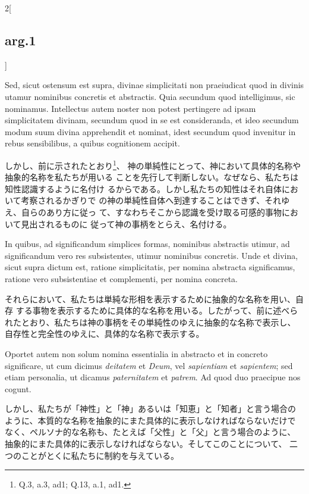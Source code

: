 \documentclass[paper=a4paper,fontsize=10pt,jafontsize=9pt,titlepage]{jlreq}
\begin{document}
\begin{paracol}{2}[\subsection{arg.1}]
\switchcolumn*

Sed,
sicut ostensum est supra, divinae simplicitati non praeiudicat quod in
divinis utamur nominibus concretis et abstractis. Quia secundum quod
intelligimus, sic nominamus. Intellectus autem noster non potest
pertingere ad ipsam simplicitatem divinam, secundum quod in se est
consideranda, et ideo secundum modum suum divina apprehendit et
nominat, idest secundum quod invenitur in rebus sensibilibus, a quibus
cognitionem accipit.

\switchcolumn

しかし、前に示されたとおり\footnote{Q.3, a.3, ad1; Q.13, a.1, ad1.}、
 神の単純性にとって、神において具体的名称や抽象的名称を私たちが用いる
 ことを先行して判断しない。なぜなら、私たちは知性認識するように名付け
 るからである。しかし私たちの知性はそれ自体において考察されるかぎりで
 の神の単純性自体へ到達することはできず、それゆえ、自らのあり方に従っ
 て、すなわちそこから認識を受け取る可感的事物において見出されるものに
 従って神の事柄をとらえ、名付ける。

\switchcolumn*

In quibus, ad significandum simplices formas,
nominibus abstractis utimur, ad significandum vero res subsistentes,
utimur nominibus concretis. Unde et divina, sicut supra dictum est,
ratione simplicitatis, per nomina abstracta significamus, ratione vero
subsistentiae et complementi, per nomina concreta.

\switchcolumn

それらにおいて、私たちは単純な形相を表示するために抽象的な名称を用い、自存
 する事物を表示するために具体的な名称を用いる。したがって、前に述べら
 れたとおり、私たちは神の事柄をその単純性のゆえに抽象的な名称で表示し、
 自存性と完全性のゆえに、具体的な名称で表示する。

\switchcolumn*

Oportet autem non
solum nomina essentialia in abstracto et in concreto significare, ut
cum dicimus {\itshape deitatem} et {\itshape Deum}, vel {\itshape sapientiam} et {\itshape sapientem}; sed etiam
personalia, ut dicamus {\itshape paternitatem} et {\itshape patrem}. Ad quod duo praecipue
nos cogunt.

\switchcolumn

しかし、私たちが「神性」と「神」あるいは「知恵」と「知者」と言う場合の
 ように、本質的な名称を抽象的にまた具体的に表示しなければならないだけで
 なく、ペルソナ的な名称も、たとえば「父性」と「父」と言う場合のように、
 抽象的にまた具体的に表示しなければならない。そしてこのことについて、
 二つのことがとくに私たちに制約を与えている。


\end{paracol}
\end{document}

